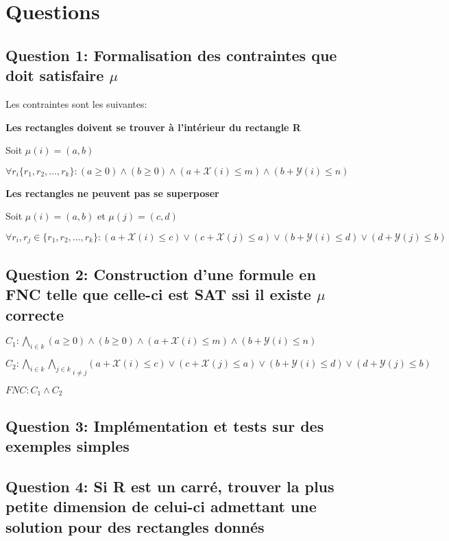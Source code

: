 \documentclass[a4paper,10pt]{article}
\begin{document}
\section{Questions}

\subsection{Question 1: Formalisation des contraintes que doit satisfaire $\mu$}

Les contraintes sont les suivantes: 

\textbf{Les rectangles doivent se trouver à l'intérieur du rectangle R}

Soit $\mu(i) = (a,b)$

$\forall r_i \{r_1,r_2,\ldots,r_k\} : (a \geq 0) \land (b \geq 0) \land (a+\mathcal{X}(i) \leq m) \land (b + \mathcal{Y}(i) \leq n)$ 

\textbf{Les rectangles ne peuvent pas se superposer}

Soit $\mu(i) = (a,b)$ et $\mu(j) = (c,d)$

$\forall r_i,r_j \in \{r_1,r_2,\ldots,r_k\} : (a + \mathcal{X}(i) \leq c) \lor (c + \mathcal{X}(j) \leq a) \lor (b + \mathcal{Y}(i) \leq d) \lor (d + \mathcal{Y}(j) \leq b)$

\subsection{Question 2: Construction d'une formule en FNC telle que celle-ci est SAT ssi il existe $\mu$ correcte}

$C_1 : \bigwedge\limits_{i \in k} (a \geq 0) \land (b \geq 0) \land (a+\mathcal{X}(i) \leq m) \land (b + \mathcal{Y}(i) \leq n)$

$C_2 : {\bigwedge\limits_{i \in k} \bigwedge\limits_{j \in k}}_{i\neq j} (a + \mathcal{X}(i) \leq c) \lor (c + \mathcal{X}(j) \leq a) \lor (b + \mathcal{Y}(i) \leq d) \lor (d + \mathcal{Y}(j) \leq b)$

\begin{center}
$FNC: C_1 \wedge C_2$
\end{center}

\subsection{Question 3: Implémentation et tests sur des exemples simples}

\subsection{Question 4: Si R est un carré, trouver la plus petite dimension de celui-ci admettant une solution pour des rectangles donnés}
\end{document}
